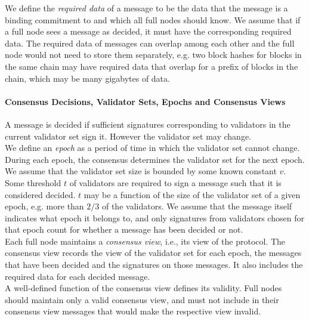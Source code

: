 \noindent We define the {\it required data} of a message to be the data that the message is a binding commitment to 
and which all full nodes should know. We assume that if a full node sees a message as decided, it must have 
the corresponding required data. The required data of messages can overlap among each other and the full node 
would not need to store them separately, e.g. two block hashes for blocks in the same chain may have required data 
that overlap for a prefix of blocks in the chain, which may be many gigabytes of data.

\paragraph{Consensus Decisions, Validator Sets, Epochs and Consensus Views}

\noindent A message is decided if sufficient signatures corresponding to validators in the current validator set sign it. However the validator set may change. \\

\noindent We define an {\it epoch} as a period of time in which the validator set cannot change. During each epoch, the consensus determines the validator set 
for the next epoch. \\

\noindent We assume that the validator set size is bounded by some known constant $v$. Some threshold $t$ of validators are required to sign a message such that it is considered 
decided. $t$ may be a function of the size of the validator set of a given epoch, e.g. more than $2/3$ of the validators. We assume that the message itself indicates what epoch it belongs to, 
and only signatures from validators chosen for that epoch count for whether a message has been decided or not. \\


\noindent Each full node maintains a {\it consensus view}, i.e., its view of the protocol. The consensus view records the view of the validator set for each epoch, 
the messages that have been decided and the signatures on those messages. It also includes the required data for each decided message. \\

\noindent A well-defined function of the consensus view defines its validity. Full nodes should maintain only a valid consensus view, and must not include in their consensus view 
messages that would make the respective view invalid. 

